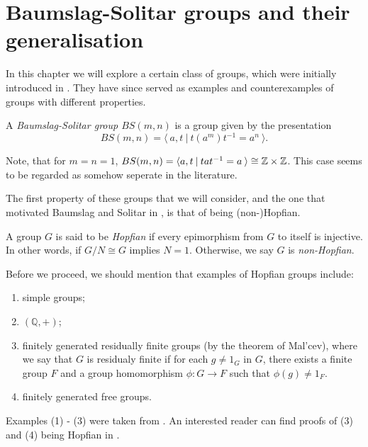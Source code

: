 \pagebreak %

\section{Baumslag-Solitar groups and their generalisation}

In this chapter we will explore a certain class of groups, which were initially introduced in \cite{BaSo62}. They have since served as examples and counterexamples of groups with different properties.

\begin{definition}
    A \emph{Baumslag-Solitar group $BS(m,n)$} is a group given by the presentation \[BS(m,n) = \langle \: a, t\:|\:t(a^m)t^{-1} = a^n \: \rangle .\]
\end{definition}

\begin{remark}
    Note, that for $m = n = 1$, $BS(m,n) = \langle a,t \: | \: tat^{-1} = a \: \rangle \cong \mathbb{Z} \times \mathbb{Z}$. This case seems to be regarded as somehow seperate in the literature.
\end{remark}

The first property of these groups that we will consider, and the one that motivated Baumslag and Solitar in \cite{BaSo62}, is that of being (non-)Hopfian.

\begin{definition}
    A group $G$ is said to be \emph{Hopfian} if every epimorphism from $G$ to itself is injective. In other words, if $G/N \cong G$ implies $N = 1$. Otherwise, we say $G$ is \emph{non-Hopfian}.
\end{definition}
    
Before we proceed, we should mention that examples of Hopfian groups include:
\begin{enumerate}
    \item simple groups;
    \item $(\mathbb{Q},+)$;
    \item finitely generated residually finite groups (by the theorem of Mal'cev), where we say that $G$ is residualy finite if for each $g \neq 1_G$ in $G$, there exists a finite group $F$ and a group homomorphism $\phi: G \to F$ such that $\phi(g) \neq 1_F$.
    \item finitely generated free groups.
\end{enumerate}

Examples (1) - (3) were taken from \cite{CeSi23}. An interested reader can find proofs of (3) and (4) being Hopfian in \cite[~chapters I, IV]{LySch15}. 

